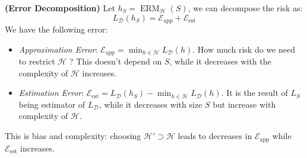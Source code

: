 \begin{remark}{\textbf{(Error Decomposition)}}
    Let $h_S = \operatorname{ERM}_\mathcal{H}(S)$, we can decompose the risk as:
    \begin{equation*}
        L_\mathcal{D}(h_S) = \mathcal{E}_\text{app} + \mathcal{E}_\text{est}
    \end{equation*}
    We have the following error:
    \begin{itemize}
        \item \emph{Approximation Error}: $\mathcal{E}_\text{app} = \min_{h\in\mathcal{H}}L_\mathcal{D}(h)$. How much risk do we need to restrict $\mathcal{H}$ ? This doesn't depend on $S$, while it decreases with the complexity of $\mathcal{H}$ increases. 
        \item \emph{Estimation Error}: $\mathcal{E}_\text{est} = L_\mathcal{D}(h_S) - \min_{h\in\mathcal{H}}L_\mathcal{D}(h)$. It is the result of $L_S$ being estimator of $L_\mathcal{D}$, while it decreases with size $S$ but increase with complexity of $\mathcal{H}$. 
    \end{itemize}
    This is bias and complexity: choosing $\mathcal{H}'\supset\mathcal{H}$ leads to decreases in $\mathcal{E}_\text{app}$ while $\mathcal{E}_\text{est}$ increases. 
\end{remark}

